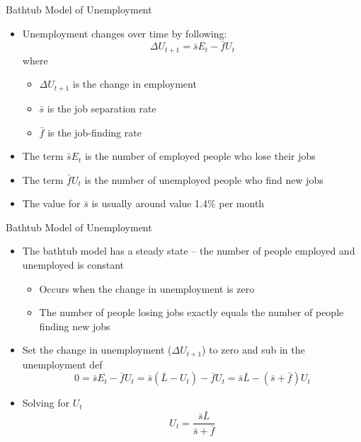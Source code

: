 \documentclass[aspectratio=1610]{beamer}
\begin{document}
\begin{frame}[wide]{Bathtub Model of Unemployment}
	\begin{itemize}
		\item Unemployment changes over time by following:
		\[\Delta U_{t+1} = \bar{s}E_t - \bar{f} U_t\]
		where
		\begin{itemize}
			\item[] $\Delta U_{t+1}$ is the change in employment
			\item[] $\bar{s}$ is the job separation rate
			\item[] $\bar{f}$ is the job-finding rate
		\end{itemize}
		\item The term $ \bar{s}E_t$ is the number of employed people who lose their jobs
		\item The term $ \bar{f} U_t$ is the number of unemployed people who find new jobs
		\item The value for $\bar{s}$ is usually around value 1.4\%  per month
	\end{itemize}
\end{frame}

\begin{frame}[wide]{Bathtub Model of Unemployment}
	\begin{itemize}
		\item The bathtub model has a steady state -- the number of people employed and unemployed is constant
		\begin{itemize}
			\item Occurs when the change in unemployment is zero
			\item The number of people losing jobs exactly equals the number of people finding new jobs
		\end{itemize}
		\item Set the change in unemployment ($\Delta U_{t+1}$) to zero and sub in the unemployment def
		\[0=\bar{s} E_t - \bar{f} U_t = \bar{s} (\bar{L} -U_t) - \bar{f} U_t = \bar{s}\bar{L} - (\bar{s}+\bar{f}) U_t\]
		\item Solving for $U_t$
		\[U_t = \frac{\bar{s}\bar{L}}{\bar{s}+\bar{f}}\]
	\end{itemize}
\end{frame}
\end{document}
